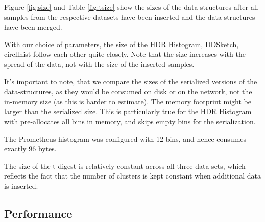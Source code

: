 \documentclass{article}
\theoremstyle{plain}
\theoremstyle{remark}
\begin{document}
Figure \ref{fig:size} and Table \ref{fig:tsize} show the sizes of the data structures after all samples
from the respective datasets have been inserted and the data structures have been merged.

With our choice of parameters, the size of the HDR Histogram, DDSketch, circllhist follow each other
quite closely. Note that the size increases with the spread of the data, not with the size of the
inserted samples.

It's important to note, that we compare the sizes of the serialized versions of the data-structures,
as they would be consumed on disk or on the network, not the in-memory size (as this is harder to
estimate). The memory footprint might be larger than the serialized size. This is particularly true
for the HDR Histogram with pre-allocates all bins in memory, and skips empty bins for the
serialization.

The Prometheus histogram was configured with 12 bins, and hence consumes exactly 96 bytes.

The size of the t-digest is relatively constant across all three data-sets, which reflects the fact
that the number of clusters is kept constant when additional data is inserted.

\subsection{Performance}
\end{document}
